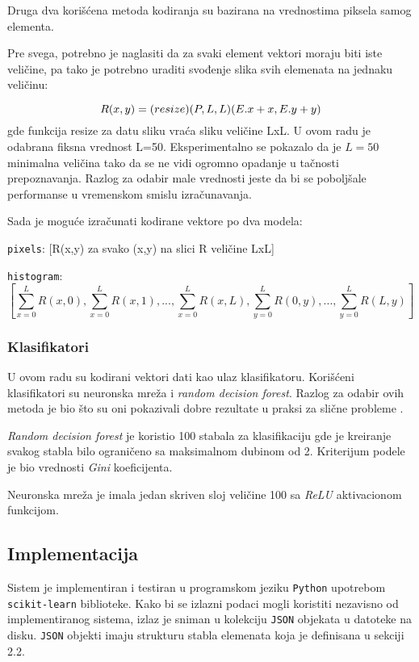 \documentclass[]{amsart}
\begin{document}
Druga dva korišćena metoda kodiranja su bazirana na vrednostima piksela samog elementa.

Pre svega, potrebno je naglasiti da za svaki element vektori moraju biti iste veličine, pa tako je potrebno uraditi svođenje slika svih elemenata
na jednaku veličinu:

$$ R(x,y) = \text(resize)(P, L, L)(E.x + x, E.y + y) $$ gde funkcija resize za datu sliku vraća sliku veličine LxL. U ovom radu je odabrana fiksna vrednost L=50. Eksperimentalno se pokazalo da je $ L=50 $ minimalna veličina tako da se ne vidi ogromno opadanje u tačnosti prepoznavanja. Razlog za odabir male vrednosti jeste da bi se poboljšale performanse u vremenskom smislu
izračunavanja.

Sada je moguće izračunati kodirane vektore po dva modela:

\texttt{pixels}: [R(x,y) za svako (x,y) na slici R veličine LxL]

\texttt{histogram}: $$ [\sum_{x=0}^L R(x, 0), \sum_{x=0}^L R(x, 1), ..., \sum_{x=0}^L R(x, L), \sum_{y=0}^L R(0, y), ...,  \sum_{y=0}^L R(L, y)] $$

\subsubsection{Klasifikatori}
\label{sec:org0ef63da}

U ovom radu su kodirani vektori dati kao ulaz klasifikatoru. Korišćeni klasifikatori su neuronska mreža i \textit{random decision forest}. Razlog za
odabir ovih metoda je bio što su oni pokazivali dobre rezultate u praksi za slične probleme \cite{bitew2018logical} \cite{he2017extracting}.

\textit{Random decision forest} je koristio 100 stabala za klasifikaciju gde je kreiranje svakog stabla bilo ograničeno sa maksimalnom dubinom od 2. Kriterijum podele je bio vrednosti \textit{Gini} koeficijenta. 

Neuronska mreža je imala jedan skriven sloj veličine 100 sa \textit{ReLU} aktivacionom funkcijom. 

\subsection{Implementacija}
\label{sec:orgf94d64a}

Sistem je implementiran i testiran u programskom jeziku \texttt{Python} upotrebom \texttt{scikit-learn} biblioteke. Kako bi se izlazni podaci mogli koristiti nezavisno od
implementiranog sistema, izlaz je sniman u kolekciju \texttt{JSON} objekata u datoteke na disku. \texttt{JSON} objekti imaju strukturu stabla elemenata koja je definisana u
sekciji 2.2.
\end{document}
